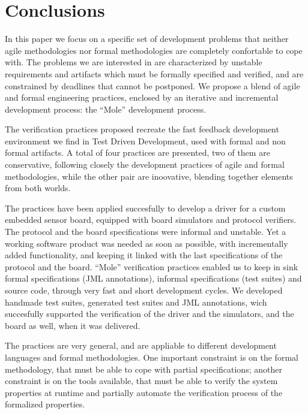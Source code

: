 \documentclass[english]{lni}
\begin{document}
\section{Conclusions}
\label{sec:conclusions}

In this paper we focus on a specific set of development problems that neither agile methodologies nor formal methodologies are completely confortable to cope with.
The problems we are interested in are characterized by unstable requirements and artifacts which must be formally specified and verified, and are constrained by deadlines that cannot be postponed.
We propose a blend of agile and formal engineering practices, enclosed by an iterative and incremental development process: the ``Mole'' development process.

The verification practices proposed recreate the fast feedback development environment we find in Test Driven Development, used with formal and non formal artifacts.
A total of four practices are presented, two of them are conservative, following closely the development practices of agile and formal methodologies, while the other pair are inoovative, blending together elements from both worlds.

The practices have been applied succesfully to develop a driver for a custom embedded sensor board, equipped with board simulators and protocol verifiers. 
The protocol and the board specifications were informal and unstable. 
Yet a working software product was needed as soon as possible, with incrementally added functionality, and keeping it linked with the last specifications of the protocol and the board.
``Mole'' verification practices enabled us to keep in sink formal specifications (JML annotations), informal specifications (test suites) and source code, through very fast and short development cycles.
We developed handmade test suites, generated test suites and JML annotations, wich succesfully supported the verification of the driver and the simulators, and the board as well, when it was delivered.

The practices are very general, and are appliable to different development languages and formal methodologies.
One important constraint is on the formal methodology, that must be able to cope with partial specifications; another constraint is on the tools available, that must be able to verify the system properties at runtime and partially automate the verification process of the formalized properties.




\end{document}
